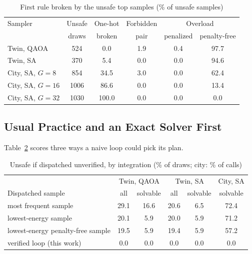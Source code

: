 \documentclass[conference]{IEEEtran}
\begin{document}
\begin{table}[t]
\caption{First rule broken by the unsafe top samples (\% of unsafe samples)}
\label{tab:viol}
\centering
\footnotesize
\setlength{\tabcolsep}{2.6pt}
\begin{tabular}{lccccc}
\toprule
Sampler & Unsafe & One-hot & Forbidden & \multicolumn{2}{c}{Overload}\\
 & draws & broken & pair & penalized & penalty-free\\
\midrule
Twin, QAOA & 524 & 0.0 & 1.9 & 0.4 & 97.7\\
Twin, SA & 370 & 5.4 & 0.0 & 0.0 & 94.6\\
City, SA, $G=8$ & 854 & 34.5 & 3.0 & 0.0 & 62.4\\
City, SA, $G=16$ & 1006 & 86.6 & 0.0 & 0.0 & 13.4\\
City, SA, $G=32$ & 1030 & 100.0 & 0.0 & 0.0 & 0.0\\
\bottomrule
\end{tabular}
\end{table}

\subsection{Usual Practice and an Exact Solver First}
\label{sec:base}
Table~\ref{tab:base} scores three ways a naive loop could pick its plan. \BaseText{}

\begin{table}[t]
\caption{Unsafe if dispatched unverified, by integration (\% of draws; city: \% of calls)}
\label{tab:base}
\centering
\footnotesize
\setlength{\tabcolsep}{2.2pt}
\begin{tabular}{lccccc}
\toprule
 & \multicolumn{2}{c}{Twin, QAOA} & \multicolumn{2}{c}{Twin, SA} & City, SA\\
Dispatched sample & all & solvable & all & solvable & solvable\\
\midrule
most frequent sample & 29.1 & 16.6 & 20.6 & 6.5 & 72.4\\
lowest-energy sample & 20.1 & 5.9 & 20.0 & 5.9 & 71.2\\
lowest-energy penalty-free sample & 19.5 & 5.9 & 19.4 & 5.9 & 57.2\\
verified loop (this work) & 0.0 & 0.0 & 0.0 & 0.0 & 0.0\\
\bottomrule
\end{tabular}
\end{table}

\ExactFirstText{} \StrongText{}
\end{document}
